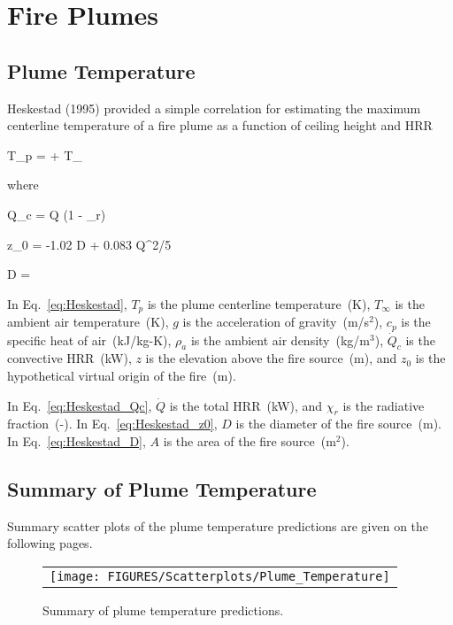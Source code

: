 \chapter{Fire Plumes}

\section{Plume Temperature}

Heskestad (1995) provided a simple correlation for estimating the maximum centerline temperature of a fire plume as a function of ceiling height and HRR

\be
T_p =  + T_\infty
\label{eq:Heskestad}
\ee

\noindent where

\be
\dot Q_c = \dot Q (1 - \chi_r)
\label{eq:Heskestad_Qc}
\ee

\be
z_0 = -1.02 D + 0.083 \dot Q^{2/5}
\label{eq:Heskestad_z0}
\ee

\be
D = 
\label{eq:Heskestad_D}
\ee

In Eq.~\ref{eq:Heskestad}, $T_p$ is the plume centerline temperature~(K), $T_\infty$ is the ambient air temperature~(K), $g$ is the acceleration of gravity~(m/s$^2$), $c_p$ is the specific heat of air~(kJ/kg-K), $\rho_{a}$ is the ambient air density~(kg/m$^3$), $\dot Q_c$ is the convective HRR~(kW), $z$ is the elevation above the fire source~(m), and $z_0$ is the hypothetical virtual origin of the fire~(m).

In Eq.~\ref{eq:Heskestad_Qc}, $\dot Q$ is the total HRR~(kW), and $\chi_r$ is the radiative fraction~(-). In Eq.~\ref{eq:Heskestad_z0}, $D$ is the diameter of the fire source~(m). In Eq.~\ref{eq:Heskestad_D}, $A$ is the area of the fire source~(m$^2$).

\clearpage

\section{Summary of Plume Temperature}

Summary scatter plots of the plume temperature predictions are given on the following pages.

\begin{figure}[ht]
\begin{center}
\begin{tabular}{l}
\texttt{[image: FIGURES/Scatterplots/Plume\_Temperature]}
\end{tabular}
\end{center}
\caption[Summary of plume temperature predictions.]
{Summary of plume temperature predictions.}
\label{Plume_Summary}
\end{figure}

